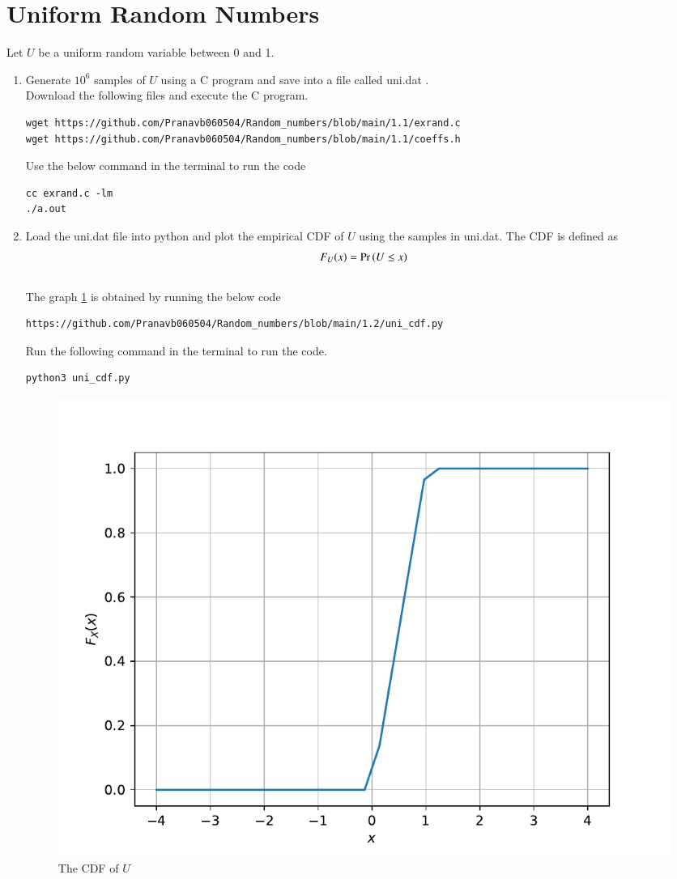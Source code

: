 \documentclass[journal,12pt,twocolumn]{IEEEtran}
\renewcommand\thesection{\arabic{section}}
\begin{document}
\section{Uniform Random Numbers}
Let $U$ be a uniform random variable between 0 and 1.
\begin{enumerate}[label=\thesection.\arabic*
,ref=\thesection.\theenumi]
\item Generate $10^6$ samples of $U$ using a C program and save into a file called uni.dat .
\\
\solution Download the following files and execute the  C program.
\begin{lstlisting}
wget https://github.com/Pranavb060504/Random_numbers/blob/main/1.1/exrand.c
wget https://github.com/Pranavb060504/Random_numbers/blob/main/1.1/coeffs.h
\end{lstlisting}
Use the below command in the terminal to run the code
\begin{lstlisting}
cc exrand.c -lm
./a.out
\end{lstlisting}

%
\item
Load the uni.dat file into python and plot the empirical CDF of $U$ using the samples in uni.dat. The CDF is defined as
\begin{align}
F_{U}(x) = \Pr\left(U \le x\right)
\end{align}
\\
\solution 
The graph \ref{fig:uni_cdf} is obtained by running the below code
\begin{lstlisting}
https://github.com/Pranavb060504/Random_numbers/blob/main/1.2/uni_cdf.py
\end{lstlisting}
Run the following command in the terminal to run the code.\\
\begin{lstlisting}
python3 uni_cdf.py
\end{lstlisting}
\begin{figure}[h]
\centering
\includegraphics[width=\columnwidth]{./uni_cdf}
\caption{The CDF of $U$}
\label{fig:uni_cdf}
\end{figure}


\end{enumerate}
\end{document}
